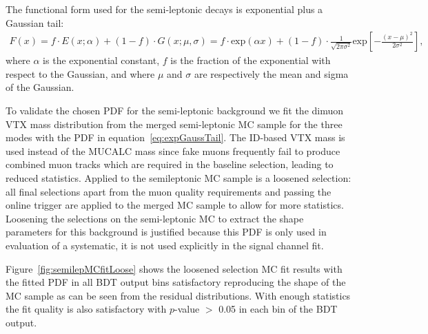 The functional form used for the semi-leptonic decays is exponential plus a Gaussian tail:
\begin{eqnarray}
  F(x) = f \cdot E(x; \alpha) + (1 - f) \cdot G(x; \mu, \sigma)  
       = f \cdot \text{exp}(\alpha x) + (1 - f) \cdot \frac{1}{\sqrt{2\pi\sigma^2}} \text{exp}\left[-\frac{(x - \mu)^2}{2\sigma^2}\right],
  \label{eq:expGaussTail}
\end{eqnarray}
where $\alpha$ is the exponential constant, $f$ is the fraction of the exponential with respect to the Gaussian, and where $\mu$ and $\sigma$ are respectively the mean and sigma of the Gaussian.

To validate the chosen PDF for the semi-leptonic background we fit the dimuon VTX mass distribution from the merged semi-leptonic MC sample for the three modes with the PDF in equation~\ref{eq:expGaussTail}. 
The ID-based VTX mass is used instead of the MUCALC mass since fake muons frequently fail to produce combined muon tracks which are required in the baseline selection, leading to reduced statistics. 
Applied to the semileptonic MC sample is a loosened selection: all final selections apart from the muon quality requirements and passing the online trigger are applied to the merged MC sample to allow for more statistics. 
Loosening the selections on the semi-leptonic MC to extract the shape parameters for this background is justified because this PDF is only used in evaluation of a systematic, it is not used explicitly in the signal channel fit.

Figure~\ref{fig:semilepMCfitLoose} shows the loosened selection MC fit results with the fitted PDF in all BDT output bins satisfactory reproducing the shape of the MC sample as can be seen from the residual distributions. With enough statistics the fit quality is also satisfactory with $p$-value $>$ 0.05 in each bin of the BDT output. 


